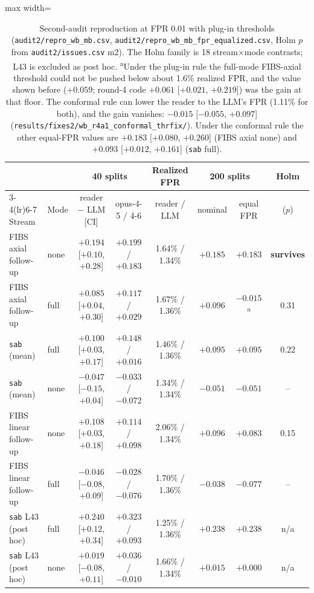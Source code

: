 \documentclass[11pt]{article}
\begin{document}
\begin{table}[!htbp]\centering\small
\begin{adjustbox}{max width=\linewidth}\begin{tabular}{@{}llcccccc@{}}
\toprule
& & \multicolumn{2}{c}{40 splits} & Realized FPR & \multicolumn{2}{c}{200 splits} & Holm\\
\cmidrule(lr){3-4}\cmidrule(lr){6-7}
Stream & Mode & reader $-$ LLM [CI] & opus-4-5 / 4-6 & reader / LLM & nominal & equal FPR & ($p$)\\
\midrule
FIBS axial follow-up & none & $\mathbf{+0.194}$ [$+0.10$, $+0.28$] & $+0.199$ / $+0.183$ & 1.64\% / 1.34\% & $+0.185$ & $\mathbf{+0.183}$ & \textbf{survives}\\
FIBS axial follow-up & full & $+0.085$ [$+0.04$, $+0.30$] & $+0.117$ / $+0.029$ & 1.67\% / 1.36\% & $+0.096$ & $\mathbf{-0.015}$\textsuperscript{a} & 0.31\\
\texttt{sab} (mean) & full & $+0.100$ [$+0.03$, $+0.17$] & $+0.148$ / $+0.016$ & 1.46\% / 1.36\% & $+0.095$ & $+0.095$ & 0.22\\
\texttt{sab} (mean) & none & $-0.047$ [$-0.15$, $+0.04$] & $-0.033$ / $-0.072$ & 1.34\% / 1.34\% & $-0.051$ & $-0.051$ & --\\
FIBS linear follow-up & none & $+0.108$ [$+0.03$, $+0.18$] & $+0.114$ / $+0.098$ & 2.06\% / 1.34\% & $+0.096$ & $+0.083$ & 0.15\\
FIBS linear follow-up & full & $-0.046$ [$-0.08$, $+0.09$] & $-0.028$ / $-0.076$ & 1.70\% / 1.36\% & $-0.038$ & $-0.077$ & --\\
\texttt{sab} L43 (post hoc) & full & $+0.240$ [$+0.12$, $+0.34$] & $+0.323$ / $+0.093$ & 1.25\% / 1.36\% & $+0.238$ & $+0.238$ & n/a\\
\texttt{sab} L43 (post hoc) & none & $+0.019$ [$-0.08$, $+0.11$] & $+0.036$ / $-0.010$ & 1.66\% / 1.34\% & $+0.015$ & $+0.000$ & n/a\\
\bottomrule
\end{tabular}\end{adjustbox}
\caption{Second-audit reproduction at FPR 0.01 with plug-in thresholds (\nolinkurl{audit2/repro_wb_mb.csv}, \nolinkurl{audit2/repro_wb_mb_fpr_equalized.csv}, Holm $p$ from \nolinkurl{audit2/issues.csv} m2). The Holm family is 18 stream$\times$mode contrasts; L43 is excluded as post hoc. \textsuperscript{a}Under the plug-in rule the full-mode FIBS-axial threshold could not be pushed below about 1.6\% realized FPR, and the value shown before ($+0.059$; round-4 code $+0.061$ [$+0.021$, $+0.219$]) was the gain at that floor. The conformal rule can lower the reader to the LLM's FPR (1.11\% for both), and the gain vanishes: $-0.015$ [$-0.055$, $+0.097$] (\nolinkurl{results/fixes2/wb_r4a1_conformal_thrfix/}). Under the conformal rule the other equal-FPR values are $+0.183$ [$+0.080$, $+0.260$] (FIBS axial none) and $+0.093$ [$+0.012$, $+0.161$] (\texttt{sab} full).}\label{tab:audit}
\end{table}
\end{document}
